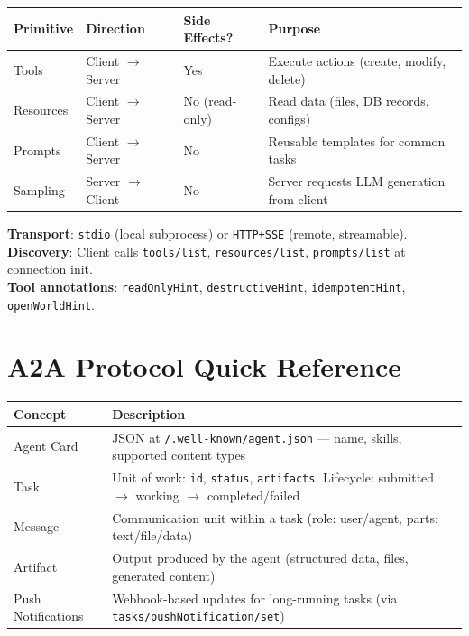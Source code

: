 \begin{tabular}{@{}lp{3.5cm}p{3.5cm}p{6cm}@{}}
\toprule
\textbf{Primitive} & \textbf{Direction} & \textbf{Side Effects?} & \textbf{Purpose} \\
\midrule
Tools & Client $\to$ Server & Yes & Execute actions (create, modify, delete) \\
Resources & Client $\to$ Server & No (read-only) & Read data (files, DB records, configs) \\
Prompts & Client $\to$ Server & No & Reusable templates for common tasks \\
Sampling & Server $\to$ Client & No & Server requests LLM generation from client \\
\bottomrule
\end{tabular}

\textbf{Transport}: \texttt{stdio} (local subprocess) or \texttt{HTTP+SSE} (remote, streamable).\\

\textbf{Discovery}: Client calls \texttt{tools/list}, \texttt{resources/list}, \texttt{prompts/list} at connection init.\\

\textbf{Tool annotations}: \texttt{readOnlyHint}, \texttt{destructiveHint}, \texttt{idempotentHint}, \texttt{openWorldHint}.

\section{A2A Protocol Quick Reference}
\label{a2a-protocol-quick-reference}

\begin{tabular}{@{}lp{11cm}@{}}
\toprule
\textbf{Concept} & \textbf{Description} \\
\midrule
Agent Card & JSON at \texttt{/.well-known/agent.json} --- name, skills, supported content types \\
Task & Unit of work: \texttt{id}, \texttt{status}, \texttt{artifacts}. Lifecycle: submitted $\to$ working $\to$ completed/failed \\
Message & Communication unit within a task (role: user/agent, parts: text/file/data) \\
Artifact & Output produced by the agent (structured data, files, generated content) \\
Push Notifications & Webhook-based updates for long-running tasks (via \texttt{tasks/pushNotification/set}) \\
\bottomrule
\end{tabular}

